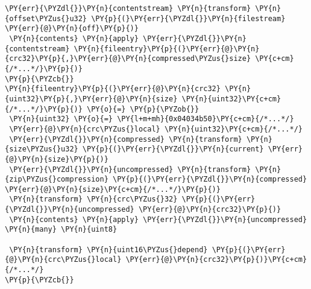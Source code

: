 \begin{Verbatim}[commandchars=\\\{\},codes={\catcode`\$=3\catcode`\^=7\catcode`\_=8}]
 \PY{err}{\PYZdl{}}\PY{n}{contentstream} \PY{n}{transform} \PY{n}{offset\PYZus{}u32} \PY{p}{(}\PY{err}{\PYZdl{}}\PY{n}{filestream} \PY{err}{@}\PY{n}{off}\PY{p}{)}
 \PY{n}{contents} \PY{n}{apply} \PY{err}{\PYZdl{}}\PY{n}{contentstream} \PY{n}{fileentry}\PY{p}{(}\PY{err}{@}\PY{n}{crc32}\PY{p}{,}\PY{err}{@}\PY{n}{compressed\PYZus{}size} \PY{c+cm}{/*...*/}\PY{p}{)}
\PY{p}{\PYZcb{}}
\PY{n}{fileentry}\PY{p}{(}\PY{err}{@}\PY{n}{crc32} \PY{n}{uint32}\PY{p}{,}\PY{err}{@}\PY{n}{size} \PY{n}{uint32}\PY{c+cm}{/*...*/}\PY{p}{)} \PY{o}{=} \PY{p}{\PYZob{}}
 \PY{n}{uint32} \PY{o}{=} \PY{l+m+mh}{0x04034b50}\PY{c+cm}{/*...*/}
 \PY{err}{@}\PY{n}{crc\PYZus{}local} \PY{n}{uint32}\PY{c+cm}{/*...*/}
 \PY{err}{\PYZdl{}}\PY{n}{compressed} \PY{n}{transform} \PY{n}{size\PYZus{}u32} \PY{p}{(}\PY{err}{\PYZdl{}}\PY{n}{current} \PY{err}{@}\PY{n}{size}\PY{p}{)}
 \PY{err}{\PYZdl{}}\PY{n}{uncompressed} \PY{n}{transform} \PY{n}{zip\PYZus{}compression} \PY{p}{(}\PY{err}{\PYZdl{}}\PY{n}{compressed} \PY{err}{@}\PY{n}{size}\PY{c+cm}{/*...*/}\PY{p}{)}
 \PY{n}{transform} \PY{n}{crc\PYZus{}32} \PY{p}{(}\PY{err}{\PYZdl{}}\PY{n}{uncompressed} \PY{err}{@}\PY{n}{crc32}\PY{p}{)}
 \PY{n}{contents} \PY{n}{apply} \PY{err}{\PYZdl{}}\PY{n}{uncompressed} \PY{n}{many} \PY{n}{uint8}
 
 \PY{n}{transform} \PY{n}{uint16\PYZus{}depend} \PY{p}{(}\PY{err}{@}\PY{n}{crc\PYZus{}local} \PY{err}{@}\PY{n}{crc32}\PY{p}{)}\PY{c+cm}{/*...*/}
\PY{p}{\PYZcb{}}
\end{Verbatim}
